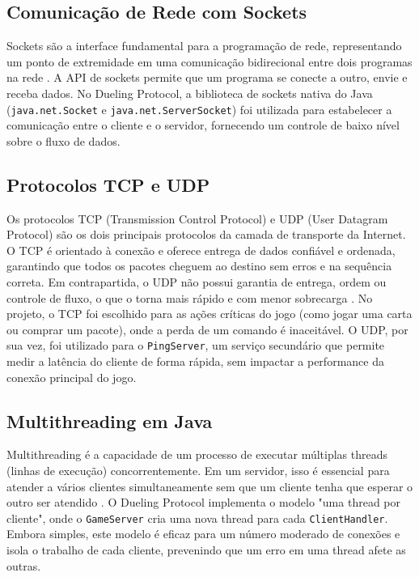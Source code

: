 \documentclass[12pt,a4paper]{article}
\begin{document}
\subsection{Comunicação de Rede com Sockets}
Sockets são a interface fundamental para a programação de rede, representando um ponto de extremidade em uma comunicação bidirecional entre dois programas na rede \cite{kurose}. A API de sockets permite que um programa se conecte a outro, envie e receba dados. No Dueling Protocol, a biblioteca de sockets nativa do Java (\texttt{java.net.Socket} e \texttt{java.net.ServerSocket}) foi utilizada para estabelecer a comunicação entre o cliente e o servidor, fornecendo um controle de baixo nível sobre o fluxo de dados.

\subsection{Protocolos TCP e UDP}
Os protocolos TCP (Transmission Control Protocol) e UDP (User Datagram Protocol) são os dois principais protocolos da camada de transporte da Internet. O TCP é orientado à conexão e oferece entrega de dados confiável e ordenada, garantindo que todos os pacotes cheguem ao destino sem erros e na sequência correta. Em contrapartida, o UDP não possui garantia de entrega, ordem ou controle de fluxo, o que o torna mais rápido e com menor sobrecarga \cite{kurose}. No projeto, o TCP foi escolhido para as ações críticas do jogo (como jogar uma carta ou comprar um pacote), onde a perda de um comando é inaceitável. O UDP, por sua vez, foi utilizado para o \texttt{PingServer}, um serviço secundário que permite medir a latência do cliente de forma rápida, sem impactar a performance da conexão principal do jogo.

\subsection{Multithreading em Java}
Multithreading é a capacidade de um processo de executar múltiplas threads (linhas de execução) concorrentemente. Em um servidor, isso é essencial para atender a vários clientes simultaneamente sem que um cliente tenha que esperar o outro ser atendido \cite{goetz}. O Dueling Protocol implementa o modelo "uma thread por cliente", onde o \texttt{GameServer} cria uma nova thread para cada \texttt{ClientHandler}. Embora simples, este modelo é eficaz para um número moderado de conexões e isola o trabalho de cada cliente, prevenindo que um erro em uma thread afete as outras.
\end{document}
